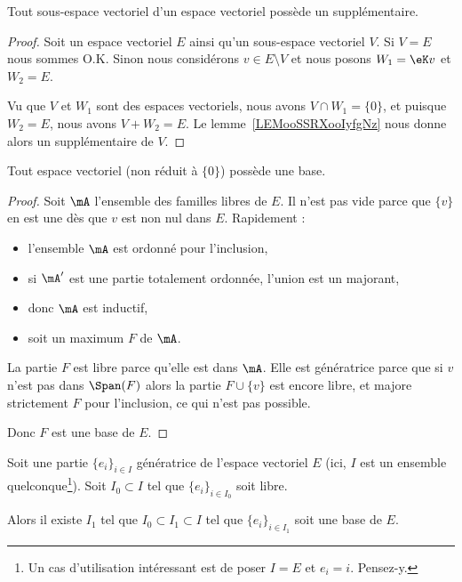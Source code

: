 \begin{corollary}
	Tout sous-espace vectoriel d'un espace vectoriel possède un supplémentaire.
\end{corollary}

\begin{proof}
	Soit un espace vectoriel \( E\) ainsi qu'un sous-espace vectoriel \( V\). Si \( V=E\) nous sommes O.K. Sinon nous considérons \( v\in E\setminus V\) et nous posons \( W_1=\eK v\) et \( W_2=E\).

	Vu que \( V\) et \( W_1\) sont des espaces vectoriels, nous avons \( V\cap W_1=\{ 0 \}\), et puisque \( W_2=E\), nous avons \( V+W_2=E\). Le lemme~\ref{LEMooSSRXooIyfgNz} nous donne alors un supplémentaire de \( V\).
\end{proof}

\begin{proposition}        \label{PROPooHDCEooMhDjPi}
	Tout espace vectoriel (non réduit à \( \{ 0 \}\)) possède une base.
\end{proposition}

\begin{proof}
	Soit \( \mA\) l'ensemble des familles libres de \( E\). Il n'est pas vide parce que \( \{ v \}\) en est une dès que \( v\) est non nul dans \( E\). Rapidement :
	\begin{itemize}
		\item l'ensemble \( \mA\) est ordonné pour l'inclusion,
		\item si \( \mA'\) est une partie totalement ordonnée, l'union est un majorant,
		\item donc \( \mA\) est inductif,
		\item soit un maximum \( F\) de \( \mA\).
	\end{itemize}
	La partie \( F\) est libre parce qu'elle est dans \( \mA\). Elle est génératrice parce que si \( v\) n'est pas dans \( \Span(F)\) alors la partie \( F\cup\{ v \}\) est encore libre, et majore strictement \( F\) pour l'inclusion, ce qui n'est pas possible.

	Donc \( F\) est une base de \( E\).
\end{proof}

\begin{theorem}      \label{THOooOQLQooHqEeDK}
	Soit une partie \( \{ e_i \}_{i\in I}\) génératrice de l'espace vectoriel \( E\) (ici, \( I\) est un ensemble quelconque\footnote{Un cas d'utilisation intéressant est de poser \( I=E\) et \( e_i=i\). Pensez-y.}). Soit \( I_0\subset I\) tel que \( \{ e_i \}_{i\in I_0}\) soit libre.

	Alors il existe \( I_1\) tel que \( I_0\subset I_1\subset I\) tel que \( \{ e_i \}_{i\in I_1}\) soit une base de \( E\).
\end{theorem}

